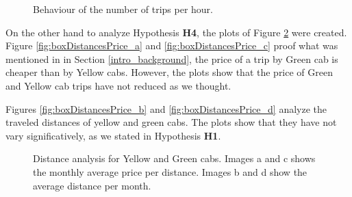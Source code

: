 \begin{figure}%
\centering
{}%
\qquad
{}%
\qquad
{}%
\qquad
{}%
\caption{Behaviour of the number of trips per hour. }
\label{fig:boxTripsWeekends }
\label{fig:boxTripsHour}%
\end{figure}



On the other hand to analyze Hypothesis \textbf{H4}, the plots of Figure \ref{fig:boxDistancesPrice} were created. Figure \ref{fig:boxDistancesPrice_a} and \ref{fig:boxDistancesPrice_c} proof what was mentioned in in Section \ref{intro_background}, the price of a trip by Green cab is cheaper than by Yellow cabs. However, the plots show that the price of Green and Yellow cab trips have not reduced as we thought.


Figures \ref{fig:boxDistancesPrice_b} and \ref{fig:boxDistancesPrice_d} analyze the traveled distances of yellow and green cabs. The plots show that they have not vary significatively, as we stated in Hypothesis \textbf{H1}.


\begin{figure}%
\centering
{}
\qquad
{}
\qquad
{}%
\caption{Distance analysis for Yellow and Green cabs. Images a and c shows the monthly average price per distance. Images b and d show the average distance per month.}
\label{fig:boxDistancesPrice}%
\end{figure}






